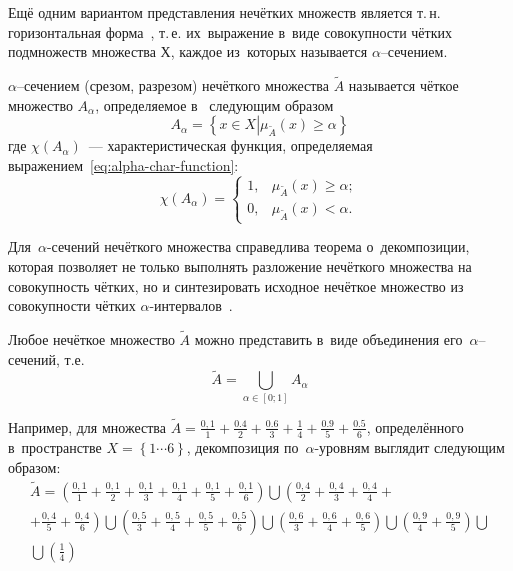 Ещё одним вариантом представления нечётких множеств является т.\,н. горизонтальная форма~\cite{Pegat}, т.\,е. их~выражение в~виде совокупности чётких подмножеств множества Х, каждое из~которых называется $\alpha$--сечением. 
\begin{mydef} 
$\alpha$--сечением (срезом, разрезом) нечёткого множества $\tilde{A}$ называется чёткое множество $A_\alpha$, определяемое в~\cite{Rutkovskaya, Pospelov, Borisov_Alexeev_Msk} следующим образом 
\begin{equation}
\label{eq:alpha-cut}
	A_{\alpha}= \left\{ x\in X \left| \mu_{\tilde A}\left( x \right)\geqslant \alpha \right. \right\}
\end{equation}
где $\chi \left( {{A}_{\alpha }} \right)$~--- характеристическая функция, определяемая выражением~\eqref{eq:alpha-char-function}:
\begin{equation}
\label{eq:alpha-char-function}
	\chi \left( {{A}_{\alpha }} \right)=\left\{
		\begin{aligned}
			1, & \mu_{\tilde A}\left( x \right) \geqslant \alpha; \\
			0, & \mu_{\tilde A}\left( x \right) < \alpha.
		\end{aligned}		 
	\right.
\end{equation}
\end{mydef}

Для~$\alpha$-сечений нечёткого множества справедлива теорема о~декомпозиции, которая позволяет не только выполнять разложение нечёткого множества на совокупность чётких, но и синтезировать исходное нечёткое множество из совокупности чётких $\alpha$-интервалов~\cite{Kaufmann}. 
\begin{theorem}
Любое нечёткое множество $\tilde{A}$ можно представить в~виде объединения его~$\alpha$--сечений, т.е.
\begin{equation}
\label{eq:alpha-cut-theorem}
	\tilde{A}=\bigcup\limits_{\alpha \in \left[ 0;1 \right]}{A_\alpha}
\end{equation}
\end{theorem}

Например, для множества $\displaystyle \tilde{A}=\frac{0,1}{1}+\frac{0.4}{2}+\frac{0.6}{3}+\frac{1}{4}+\frac{0.9}{5}+\frac{0.5}{6}$, определённого в~пространстве $\displaystyle X=\left\{ 1 \cdots 6 \right\}$, декомпозиция по~$\alpha$-уровням выглядит следующим образом:
\begin{gather*}
	  \tilde{A}=\left( \frac{0,1}{1}+\frac{0,1}{2}+\frac{0,1}{3}+\frac{0,1}{4}+\frac{0,1}{5}+\frac{0,1}{6} \right)\bigcup \left( \frac{0,4}{2}+\frac{0,4}{3}+\frac{0,4}{4}+\right.\\
	  \left. +\frac{0,4}{5}+\frac{0,4}{6} \right) \bigcup\left( \frac{0,5}{3}+\frac{0,5}{4}+\frac{0,5}{5}+\frac{0,5}{6} \right) \bigcup \left( \frac{0,6}{3}+\frac{0,6}{4}+\frac{0,6}{5} \right) \bigcup \left( \frac{0,9}{4}+\frac{0,9}{5} \right) \bigcup \\
	  \bigcup \left( \frac{1}{4} \right) 
\end{gather*}

